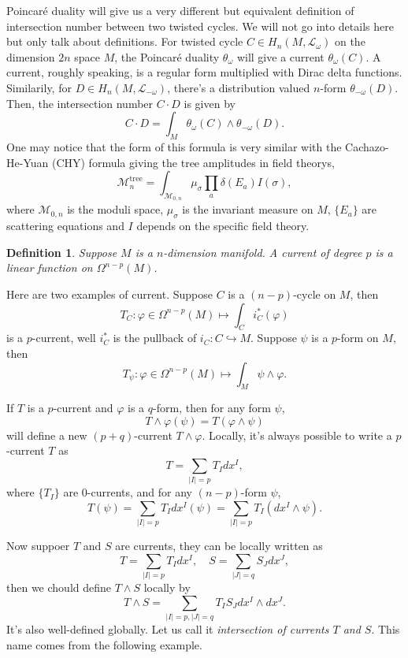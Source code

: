 \documentclass[11pt]{article}
\theoremstyle{definition}
\theoremstyle{plain}
\newtheorem{defi}[para]{Definition}
\begin{document}
Poincar\'e duality will give us a very different but
equivalent definition of intersection number between two
twisted cycles. We will not
go into details here but only talk about definitions.
For twisted cycle $C\in H_n(M,\mathcal L_\omega)$ on the 
dimension $2n$ space $M$, 
the Poincar\'e duality $\theta_{\omega}$ will give a 
current $\theta_{\omega}(C)$. 
A current, roughly speaking, is a 
regular form multiplied with Dirac delta functions. 
Similarily, for $D\in H_n(M,\mathcal L_{-\omega})$, there's
a distribution valued $n$-form $\theta_{-\omega}(D)$. Then,
the intersection number $C\cdot D$ is given by
\[
	C\cdot D=\int_{M}\theta_{\omega}(C)\wedge \theta_{-\omega}(D).
\]
One may notice that the form of this formula is very similar with the 
Cachazo-He-Yuan (CHY) formula giving the tree amplitudes in
field theorys,
\[
	\mathscr M_n^{\text{tree}}=\int_{\mathcal M_{0,n}}
	\mu_\sigma \prod_a \delta(E_a)I(\sigma),
\]
where $\mathcal M_{0,n}$ is the moduli space, $\mu_\sigma$ is the 
invariant measure on $M$, $\{E_a\}$ are scattering equations and 
$I$ depends on the specific field theory.

\begin{defi}
Suppose $M$ is a $n$-dimension manifold. A current of degree $p$ 
is a linear function on $\Omega^{n-p}(M)$.
\end{defi}

Here are two examples of current. Suppose $C$ is a $(n-p)$-cycle on $M$, 
then
\[
	T_C :\varphi \in \Omega^{n-p}(M)\mapsto \int_C i^*_C(\varphi)
\]
is a $p$-current, well $i^*_C$ is the pullback of $i_C:C\hookrightarrow M$.
Suppose $\psi$ is a $p$-form on $M$, then
\begin{equation}
T_\psi:\varphi\in \Omega^{n-p}(M)\mapsto \int_M\psi\wedge\varphi.
\end{equation}

If $T$ is a $p$-current and $\varphi$ is a $q$-form, then
for any form $\psi$,
\[
	T\wedge \varphi(\psi)=T(\varphi\wedge \psi)
\]
will define a new $(p+q)$-current $T\wedge \varphi$. Locally, it's always possible to write a $p$-current $T$ as
\[
	T=\sum_{|I|=p} T_Idx^I,
\]
where $\{T_I\}$ are $0$-currents, and for any $(n-p)$-form $\psi$,
\[
	T(\psi)=\sum_{|I|=p} T_Idx^I(\psi)=\sum_{|I|=p} T_I(dx^I\wedge\psi).
\]

Now suppoer $T$ and $S$ are currents, they can be 
locally written as
\[
	T=\sum_{|I|=p} T_Idx^I,\quad S=\sum_{|J|=q} S_Jdx^J,
\]
then we chould define $T\wedge S$ locally by
\[
	T\wedge S=\sum_{|I|=p,|J|=q}T_IS_J dx^I\wedge dx^J.
\]
It's also well-defined globally. Let us call it \textit{intersection of
currents $T$ and $S$}. This name comes from the following example.
\end{document}
